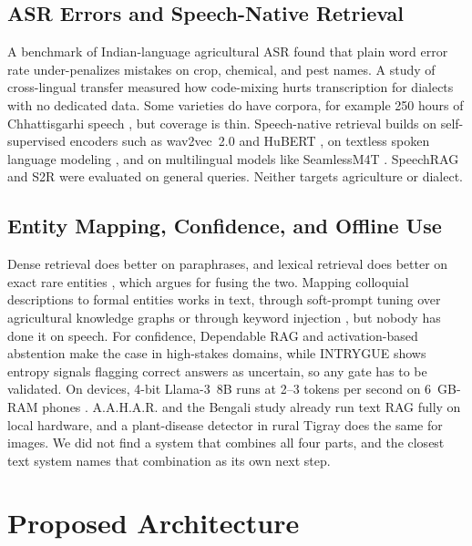 \documentclass[conference]{IEEEtran}
\begin{document}
\subsection{ASR Errors and Speech-Native Retrieval}
A benchmark of Indian-language agricultural ASR \cite{benchmarkingasr2026} found that plain word error rate under-penalizes mistakes on crop, chemical, and pest names. A study of cross-lingual transfer \cite{dialectmatters2026} measured how code-mixing hurts transcription for dialects with no dedicated data. Some varieties do have corpora, for example 250 hours of Chhattisgarhi speech \cite{singh2023respin}, but coverage is thin. Speech-native retrieval builds on self-supervised encoders such as wav2vec~2.0 \cite{baevski2020wav2vec} and HuBERT \cite{hsu2021hubert}, on textless spoken language modeling \cite{spidr2025}, and on multilingual models like SeamlessM4T \cite{barrault2023seamlessm4t}. SpeechRAG \cite{min2025speechrag} and S2R \cite{google2025s2r} were evaluated on general queries. Neither targets agriculture or dialect.

\subsection{Entity Mapping, Confidence, and Offline Use}
Dense retrieval does better on paraphrases, and lexical retrieval does better on exact rare entities \cite{sultania2024hybridsearch}, which argues for fusing the two. Mapping colloquial descriptions to formal entities works in text, through soft-prompt tuning over agricultural knowledge graphs \cite{liu2025colloquialpest,wu2026cropgraphrag,yao2024agcner,kgeditorial2023} or through keyword injection \cite{hossain2026bengalirag}, but nobody has done it on speech. For confidence, Dependable RAG \cite{dependablerag2026} and activation-based abstention \cite{abstinence2025} make the case in high-stakes domains, while INTRYGUE \cite{intrygue2026} shows entropy signals flagging correct answers as uncertain, so any gate has to be validated. On devices, 4-bit Llama-3~8B runs at 2--3 tokens per second on 6~GB-RAM phones \cite{compactllm2026}. A.A.H.A.R. and the Bengali study \cite{dubey2025aahar,hossain2026bengalirag} already run text RAG fully on local hardware, and a plant-disease detector in rural Tigray \cite{tigray2025plantdisease} does the same for images. We did not find a system that combines all four parts, and the closest text system \cite{hossain2026bengalirag} names that combination as its own next step.

\section{Proposed Architecture}\label{sec:arch}
\end{document}
